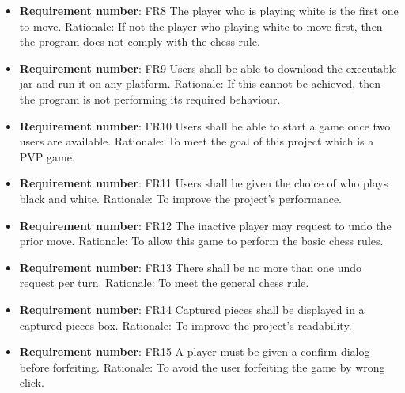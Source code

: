 \documentclass[12pt, titlepage]{article}
\begin{document}
\begin{itemize}
\item \textbf{Requirement number}: FR8\newline
The player who is playing white is the first one to move.\newline
Rationale: If not the player who playing white to move first, then the program does not comply with the chess rule.
 
\item \textbf{Requirement number}: FR9\newline
Users shall be able to download the executable jar and run it on any platform.\newline
Rationale: If this cannot be achieved, then the program is not performing its required behaviour.
 
\item \textbf{Requirement number}: FR10\newline
Users shall be able to start a game once two users are available. \newline
Rationale: To meet the goal of this project which is a PVP game.

\item \textbf{Requirement number}: FR11\newline
Users shall be given the choice of who plays black and white. \newline
Rationale: To improve the project’s performance.

\item \textbf{Requirement number}: FR12\newline
The inactive player may request to undo the prior move. \newline
Rationale: To allow this game to perform the basic chess rules.
 
\item \textbf{Requirement number}: FR13\newline
There shall be no more than one undo request per turn.\newline
Rationale: To meet the general chess rule.
 
\item \textbf{Requirement number}: FR14\newline
Captured pieces shall be displayed in a captured pieces box. \newline
Rationale: To improve the project’s readability.
 
\item \textbf{Requirement number}: FR15\newline
A player must be given a confirm dialog before forfeiting. \newline
Rationale: To avoid the user forfeiting the game by wrong click.
 

\end{itemize}
\end{document}
